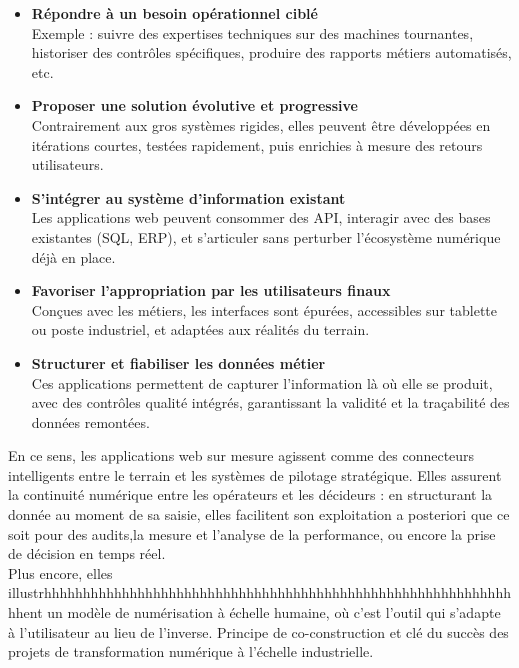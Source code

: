 \documentclass[11pt,a4paper]{article}
\begin{document}
\begin{itemize}
    \item \textbf{Répondre à un besoin opérationnel ciblé} \\
    Exemple : suivre des expertises techniques sur des machines tournantes, historiser des contrôles spécifiques, produire des rapports métiers automatisés, etc.

    \item \textbf{Proposer une solution évolutive et progressive} \\
    Contrairement aux gros systèmes rigides, elles peuvent être développées en itérations courtes, testées rapidement, puis enrichies à mesure des retours utilisateurs.

    \item \textbf{S’intégrer au système d’information existant} \\
    Les applications web peuvent consommer des API, interagir avec des bases existantes (SQL, ERP), et s’articuler sans perturber l’écosystème numérique déjà en place.

    \item \textbf{Favoriser l’appropriation par les utilisateurs finaux} \\
    Conçues avec les métiers, les interfaces sont épurées, accessibles sur tablette ou poste industriel, et adaptées aux réalités du terrain.

    \item \textbf{Structurer et fiabiliser les données métier} \\
    Ces applications permettent de capturer l'information là où elle se produit, avec des contrôles qualité intégrés, garantissant la validité et la traçabilité des données remontées.
\end{itemize}


En ce sens, les applications web sur mesure agissent comme des connecteurs intelligents entre le terrain et les systèmes de pilotage stratégique. Elles assurent la continuité numérique entre les opérateurs et les décideurs : en structurant la donnée au moment de sa saisie, elles facilitent son exploitation a posteriori que ce soit pour des audits,la mesure et l'analyse de la performance, ou encore la prise de décision en temps réel.
\\
Plus encore, elles illustrhhhhhhhhhhhhhhhhhhhhhhhhhhhhhhhhhhhhhhhhhhhhhhhhhhhhhhhhhhhhhhent un modèle de numérisation à échelle humaine, où c’est l’outil qui s’adapte à l’utilisateur au lieu de l’inverse. Principe de co-construction et clé du succès des projets de transformation numérique à l’échelle industrielle.
\end{document}
